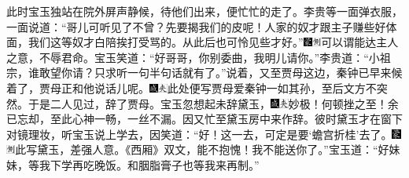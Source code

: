 此时宝玉独站在院外屏声静候，待他们出来，便忙忙的走了。李贵等一面弹衣服，一面说道：“哥儿可听见了不曾？先要揭我们的皮呢！人家的奴才跟主子赚些好体面，我们这等奴才白陪挨打受骂的。从此后也可怜见些才好。”{\includegraphics[width=3mm]{../Images/00006}\includegraphics[width=3mm]{../Images/00011}\footnotesize \kaishu 可以谓能达主人之意，不辱君命。}宝玉笑道：“好哥哥，你别委曲，我明儿请你。”李贵道：“小祖宗，谁敢望你请？只求听一句半句话就有了。”说着，又至贾母这边，秦钟已早来候着了，贾母正和他说话儿呢。{\includegraphics[width=3mm]{../Images/00005}\includegraphics[width=3mm]{../Images/00012}\footnotesize \kaishu 此处便写贾母爱秦钟一如其孙，至后文方不突然。}于是二人见过，辞了贾母。宝玉忽想起未辞黛玉，{\includegraphics[width=3mm]{../Images/00005}\includegraphics[width=3mm]{../Images/00012}\footnotesize \kaishu 妙极！何顿挫之至！余已忘却，至此心神一畅，一丝不漏。}因又忙至黛玉房中来作辞。彼时黛玉才在窗下对镜理妆，听宝玉说上学去，因笑道：“好！这一去，可定是要‘蟾宫折桂’去了。{\includegraphics[width=3mm]{../Images/00006}\includegraphics[width=3mm]{../Images/00011}\footnotesize \kaishu 此写黛玉，差强人意。《西厢》双文，能不抱愧！}我不能送你了。”宝玉道：“好妹妹，等我下学再吃晚饭。和胭脂膏子也等我来再制。”
